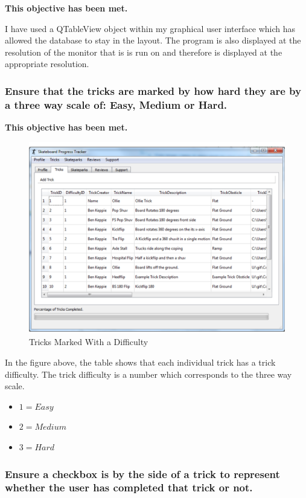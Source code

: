 \textbf{This objective has been met.}

I have used a QTableView object within my graphical user interface which has allowed the database to stay in the layout. The program is also displayed at the resolution of the monitor that is is run on and therefore is displayed at the appropriate resolution.

\subsubsection {Ensure that the tricks are marked by how hard they are by a three way scale of: Easy, Medium or Hard.}

\textbf{This objective has been met.}

\begin{figure}[H]
    \includegraphics[width=\textwidth]{./Evaluation/images/TricksTableNFS.pdf}
    \caption{Tricks Marked With a Difficulty} \label{fig:TricksTableDiff}
\end{figure}

In the figure above, the table shows that each individual trick has a trick difficulty. The trick difficulty is a number which corresponds to the three way scale.

\begin{itemize}
\item $1 = Easy$
\item $2 = Medium$
\item $3 = Hard$
\end{itemize}


\subsubsection {Ensure a checkbox is by the side of a trick to represent whether the user has completed that trick or not.}

